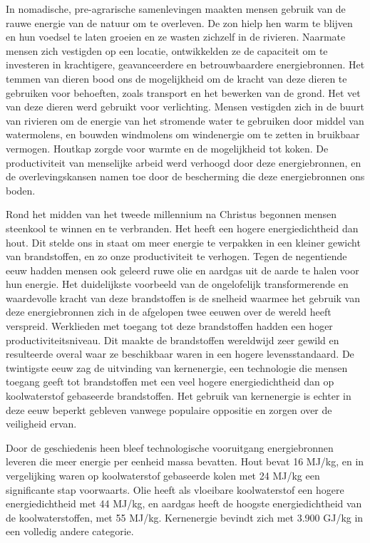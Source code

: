 In nomadische, pre-agrarische samenlevingen maakten mensen gebruik van de rauwe energie van de natuur om te overleven. De zon hielp hen warm te blijven en hun voedsel te laten groeien en ze wasten zichzelf in de rivieren. Naarmate mensen zich vestigden op een locatie, ontwikkelden ze de capaciteit om te investeren in krachtigere, geavanceerdere en betrouwbaardere energiebronnen. Het temmen van dieren bood ons de mogelijkheid om de kracht van deze dieren te gebruiken voor behoeften, zoals transport en het bewerken van de grond. Het vet van deze dieren werd gebruikt voor verlichting. Mensen vestigden zich in de buurt van rivieren om de energie van het stromende water te gebruiken door middel van watermolens, en bouwden windmolens om windenergie om te zetten in bruikbaar vermogen. Houtkap zorgde voor warmte en de mogelijkheid tot koken. De productiviteit van menselijke arbeid werd verhoogd door deze energiebronnen, en de overlevingskansen namen toe door de bescherming die deze energiebronnen ons boden.

Rond het midden van het tweede millennium na Christus begonnen mensen steenkool te winnen en te verbranden. Het heeft een hogere energiedichtheid dan hout. Dit stelde ons in staat om meer energie te verpakken in een kleiner gewicht van brandstoffen, en zo onze productiviteit te verhogen. Tegen de negentiende eeuw hadden mensen ook geleerd ruwe olie en aardgas uit de aarde te halen voor hun energie. Het duidelijkste voorbeeld van de ongelofelijk transformerende en waardevolle kracht van deze brandstoffen is de snelheid waarmee het gebruik van deze energiebronnen zich in de afgelopen twee eeuwen over de wereld heeft verspreid. Werklieden met toegang tot deze brandstoffen hadden een hoger productiviteitsniveau. Dit maakte de brandstoffen wereldwijd zeer gewild en resulteerde overal waar ze beschikbaar waren in een hogere levensstandaard. De twintigste eeuw zag de uitvinding van kernenergie, een technologie die mensen toegang geeft tot brandstoffen met een veel hogere energiedichtheid dan op koolwaterstof gebaseerde brandstoffen. Het gebruik van kernenergie is echter in deze eeuw beperkt gebleven vanwege populaire oppositie en zorgen over de veiligheid ervan.

Door de geschiedenis heen bleef technologische vooruitgang energiebronnen leveren die meer energie per eenheid massa bevatten. Hout bevat 16 MJ/kg, en in vergelijking waren op koolwaterstof gebaseerde kolen met 24 MJ/kg een significante stap voorwaarts. Olie heeft als vloeibare koolwaterstof een hogere energiedichtheid met 44 MJ/kg, en aardgas heeft de hoogste energiedichtheid van de koolwaterstoffen, met 55 MJ/kg. Kernenergie bevindt zich met 3.900 GJ/kg in een volledig andere categorie. \autocite{93}

